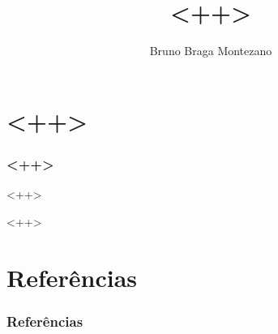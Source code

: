 \documentclass{beamer}
\title{<++>}
\author{Bruno Braga Montezano}
\institute{<++>}
\begin{document}
\begin{frame}

\maketitle

\end{frame}

\section{<++>}

\begin{frame}
\frametitle{<++>}

<++>


\end{frame}

<++>

\section{Referências}

\begin{frame}
\frametitle{Referências}
\printbibliography
\end{frame}
\end{document}
